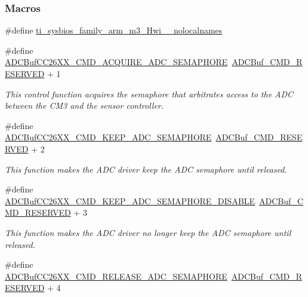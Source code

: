 \subsubsection*{Macros}
\begin{DoxyCompactItemize}
\item 
\#define \hyperlink{_a_d_c_buf_c_c26_x_x_8h_aaa17ecf48f5762e2e1bdb0bab8aacf0c}{ti\+\_\+sysbios\+\_\+family\+\_\+arm\+\_\+m3\+\_\+\+Hwi\+\_\+\+\_\+nolocalnames}
\item 
\#define \hyperlink{group___a_d_c_buf___c_m_d_ga0a536e47b039d0f506a4245079af247e}{A\+D\+C\+Buf\+C\+C26\+X\+X\+\_\+\+C\+M\+D\+\_\+\+A\+C\+Q\+U\+I\+R\+E\+\_\+\+A\+D\+C\+\_\+\+S\+E\+M\+A\+P\+H\+O\+R\+E}~\hyperlink{_a_d_c_buf_8h_a6d889e191027535ad318be0b9c3765d1}{A\+D\+C\+Buf\+\_\+\+C\+M\+D\+\_\+\+R\+E\+S\+E\+R\+V\+E\+D} + 1
\begin{DoxyCompactList}\small\item\em This control function acquires the semaphore that arbitrates access to the A\+D\+C between the C\+M3 and the sensor controller. \end{DoxyCompactList}\item 
\#define \hyperlink{group___a_d_c_buf___c_m_d_ga830dac4199ded43c278e48bb1fe9725e}{A\+D\+C\+Buf\+C\+C26\+X\+X\+\_\+\+C\+M\+D\+\_\+\+K\+E\+E\+P\+\_\+\+A\+D\+C\+\_\+\+S\+E\+M\+A\+P\+H\+O\+R\+E}~\hyperlink{_a_d_c_buf_8h_a6d889e191027535ad318be0b9c3765d1}{A\+D\+C\+Buf\+\_\+\+C\+M\+D\+\_\+\+R\+E\+S\+E\+R\+V\+E\+D} + 2
\begin{DoxyCompactList}\small\item\em This function makes the A\+D\+C driver keep the A\+D\+C semaphore until released. \end{DoxyCompactList}\item 
\#define \hyperlink{group___a_d_c_buf___c_m_d_ga23015764922f21c49518aa1050d70c0e}{A\+D\+C\+Buf\+C\+C26\+X\+X\+\_\+\+C\+M\+D\+\_\+\+K\+E\+E\+P\+\_\+\+A\+D\+C\+\_\+\+S\+E\+M\+A\+P\+H\+O\+R\+E\+\_\+\+D\+I\+S\+A\+B\+L\+E}~\hyperlink{_a_d_c_buf_8h_a6d889e191027535ad318be0b9c3765d1}{A\+D\+C\+Buf\+\_\+\+C\+M\+D\+\_\+\+R\+E\+S\+E\+R\+V\+E\+D} + 3
\begin{DoxyCompactList}\small\item\em This function makes the A\+D\+C driver no longer keep the A\+D\+C semaphore until released. \end{DoxyCompactList}\item 
\#define \hyperlink{group___a_d_c_buf___c_m_d_gaaacc1d31de8c38e71c351bc1fcd54340}{A\+D\+C\+Buf\+C\+C26\+X\+X\+\_\+\+C\+M\+D\+\_\+\+R\+E\+L\+E\+A\+S\+E\+\_\+\+A\+D\+C\+\_\+\+S\+E\+M\+A\+P\+H\+O\+R\+E}~\hyperlink{_a_d_c_buf_8h_a6d889e191027535ad318be0b9c3765d1}{A\+D\+C\+Buf\+\_\+\+C\+M\+D\+\_\+\+R\+E\+S\+E\+R\+V\+E\+D} + 4

\end{DoxyCompactItemize}
